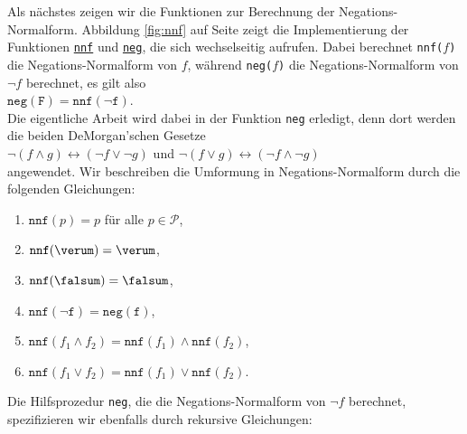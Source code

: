Als nächstes zeigen wir die Funktionen zur Berechnung der Negations-Normalform.
Abbildung
\ref{fig:nnf} auf Seite \pageref{fig:nnf} zeigt die Implementierung der Funktionen
\href{https://github.com/karlstroetmann/Logic/blob/master/SetlX/knf.stlx}{\texttt{nnf}} und
\href{https://github.com/karlstroetmann/Logic/blob/master/SetlX/knf.stlx}{\texttt{neg}},
die sich wechselseitig aufrufen.  Dabei berechnet \texttt{nnf($f$)} die Negations-Normalform von $f$, während  
\texttt{neg($f$)} die Negations-Normalform von $\neg f$ berechnet,  es gilt also
\\[0.2cm]
\hspace*{1.3cm}
$\texttt{neg}(\texttt{F}) = \texttt{nnf}(\neg \texttt{f})$.
\\[0.2cm]
 Die eigentliche Arbeit wird dabei in der
Funktion \texttt{neg} erledigt, denn dort werden die beiden DeMorgan'schen Gesetze 
\\[0.2cm]
\hspace*{1.3cm}
$\neg (f \wedge g) \leftrightarrow (\neg f \vee \neg g)$ \quad und \quad 
$\neg (f \vee g) \leftrightarrow (\neg f \wedge \neg g)$ 
\\[0.2cm]
angewendet.  Wir beschreiben die Umformung in Negations-Normalform durch 
die folgenden Glei\-chungen: 
\begin{enumerate}
\item $\texttt{nnf}(p) = p$ \quad für alle $p \in \mathcal{P}$,
\item $\texttt{nnf}(\verum) = \verum$,
\item $\texttt{nnf}(\falsum) = \falsum$,
\item $\texttt{nnf}(\neg \texttt{f}) = \texttt{neg}(\texttt{f})$,
\item $\texttt{nnf}(f_1 \wedge f_2) = \texttt{nnf}(f_1) \wedge \texttt{nnf}(f_2)$,
\item $\texttt{nnf}(f_1 \vee f_2) = \texttt{nnf}(f_1) \vee \texttt{nnf}(f_2)$.
\end{enumerate}
Die Hilfsprozedur \texttt{neg}, die die Negations-Normalform von $\neg f$ berechnet,
spezifizieren wir ebenfalls durch rekursive Gleichungen: 
